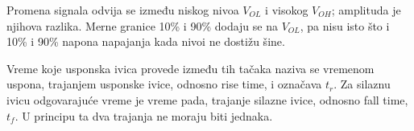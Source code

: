 Promena signala odvija se između niskog nivoa $V_{OL}$ i visokog $V_{OH}$; amplituda je njihova razlika. Merne granice 10\% i 90\% dodaju se na $V_{OL}$, pa nisu isto što i 10\% i 90\% napona napajanja kada nivoi ne dostižu šine.

Vreme koje usponska ivica provede između tih tačaka naziva se vremenom uspona, trajanjem usponske ivice, odnosno rise time, i označava $t_r$. Za silaznu ivicu odgovarajuće vreme je vreme pada, trajanje silazne ivice, odnosno fall time, $t_f$. U principu ta dva trajanja ne moraju biti jednaka.

